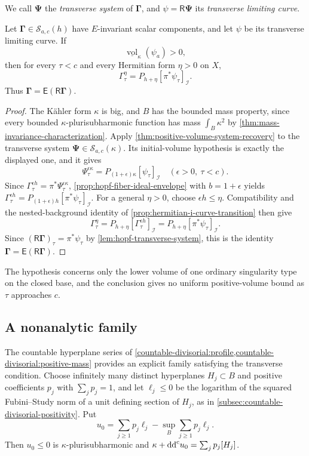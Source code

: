 We call $\boldsymbol\Psi$ the \emph{transverse system} of $\boldsymbol\Gamma$, and $\psi=\mathsf R\boldsymbol\Psi$ its \emph{transverse limiting curve}.

\begin{theorem}\label{thm:hopf-transverse-recovery}
Let $\boldsymbol\Gamma\in\mathscr S_{a,c}(h)$ have $E$-invariant scalar components, and let $\psi$ be its transverse limiting curve. If
\[
 \underline{\operatorname{vol}}_\kappa(\psi_a)>0,
\]
then for every $\tau<c$ and every Hermitian form $\eta>0$ on $X$,
\[
 \Gamma_\tau^\eta=P_{h+\eta}[\pi^*\psi_\tau]_{\mathcal I}.
\]
Thus $\boldsymbol\Gamma=\mathsf E(\mathsf R\boldsymbol\Gamma)$.
\end{theorem}
\begin{proof}
The K\"ahler form $\kappa$ is big, and $B$ has the bounded mass property, since every bounded $\kappa$-plurisubharmonic function has mass $\int_B\kappa^2$ by \cref{thm:mass-invariance-characterization}. Apply \cref{thm:positive-volume-system-recovery} to the transverse system $\boldsymbol\Psi\in\mathscr S_{a,c}(\kappa)$. Its initial-volume hypothesis is exactly the displayed one, and it gives
\[
 \Psi_\tau^{\epsilon\kappa}
       =P_{(1+\epsilon)\kappa}[\psi_\tau]_{\mathcal I}
                    \quad(\epsilon>0,\ \tau<c).
\]
Since $\Gamma_\tau^{\epsilon h}=\pi^*\Psi_\tau^{\epsilon\kappa}$, \cref{prop:hopf-fiber-ideal-envelope} with $b=1+\epsilon$ yields
$\Gamma_\tau^{\epsilon h}=P_{(1+\epsilon)h}[\pi^*\psi_\tau]_{\mathcal I}$.
For a general $\eta>0$, choose $\epsilon h\leq\eta$. Compatibility and the nested-background identity of \cref{prop:hermitian-i-curve-transition} then give
\[
 \Gamma_\tau^\eta
 =P_{h+\eta}[\Gamma_\tau^{\epsilon h}]_{\mathcal I}
 =P_{h+\eta}[\pi^*\psi_\tau]_{\mathcal I}.
\]
Since $(\mathsf R\boldsymbol\Gamma)_\tau=\pi^*\psi_\tau$ by \cref{lem:hopf-transverse-system}, this is the identity $\boldsymbol\Gamma=\mathsf E(\mathsf R\boldsymbol\Gamma)$.
\end{proof}

The hypothesis concerns only the lower volume of one ordinary singularity type on the closed base, and the conclusion gives no uniform positive-volume bound as $\tau$ approaches $c$.

\subsection{A nonanalytic family}

The countable hyperplane series of \cref{countable-divisorial:profile,countable-divisorial:positive-mass} provides an explicit family satisfying the transverse condition. Choose infinitely many distinct hyperplanes $H_j\subset B$ and positive coefficients $p_j$ with $\sum_jp_j=1$, and let $\ell_j\leq0$ be the logarithm of the squared Fubini--Study norm of a unit defining section of $H_j$, as in \cref{subsec:countable-divisorial-positivity}. Put
\[
 u_0=\sum_{j\geq1}p_j\ell_j
                   -\sup_B\sum_{j\geq1}p_j\ell_j.
\]
Then $u_0\leq0$ is $\kappa$-plurisubharmonic and $\kappa+\mathrm{dd}^{\mathrm{c}} u_0=\sum_jp_j[H_j]$.

